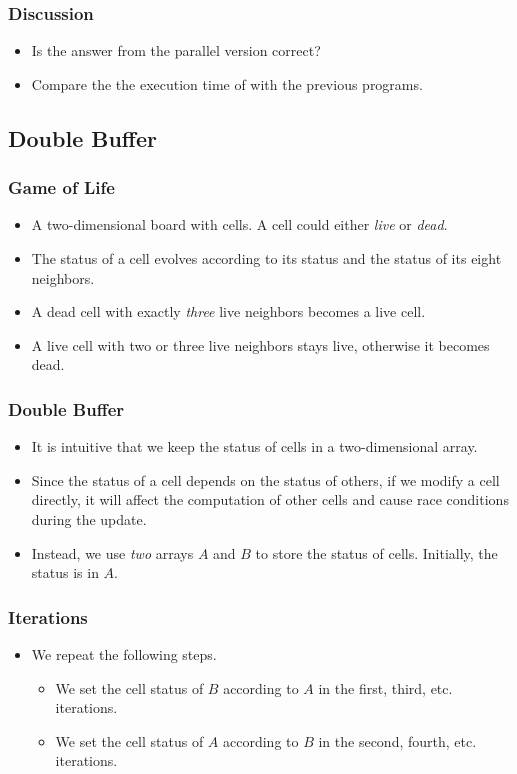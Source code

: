 \documentclass{beamer}
\begin{document}
\begin{frame}
  \frametitle{Discussion}
  \begin{itemize}
  \item Is the answer from the parallel version correct? 
  \item Compare the the execution time of with the previous
    programs.
  \end{itemize}
\end{frame}

\subsection{Double Buffer}

\begin{frame}
  \frametitle{Game of Life}
  \begin{itemize}
  \item A two-dimensional board with cells.  A cell could either {\em
    live} or {\em dead}.
  \item The status of a cell evolves according to its status and the
      status of  its eight neighbors.
  \item A dead cell with exactly {\em three} live neighbors becomes
    a live cell. 
  \item A live cell with two or three live neighbors stays live,
    otherwise it becomes dead.
  \end{itemize}
\end{frame}

\begin{frame}
  \frametitle{Double Buffer}
  \begin{itemize}
    \item It is intuitive that we keep the status of cells in a two-dimensional array.
    \item Since the status of a cell depends on the status of others, if we modify a cell directly, it will affect the computation of other cells and cause race conditions during the update.
    \item Instead, we use {\em two} arrays $A$ and $B$ to store the
      status of cells.  Initially, the status is in $A$. 
  \end{itemize}
\end{frame}

\begin{frame}
  \frametitle{Iterations}
  \begin{itemize}
    \item We repeat the following steps.
      \begin{itemize}
      \item We set the cell status of $B$ according to $A$ in the
        first, third, etc. iterations.
      \item We set the cell status of $A$ according to $B$ in the
        second, fourth, etc. iterations.
      \end{itemize}
  \end{itemize}
\end{frame}
\end{document}
